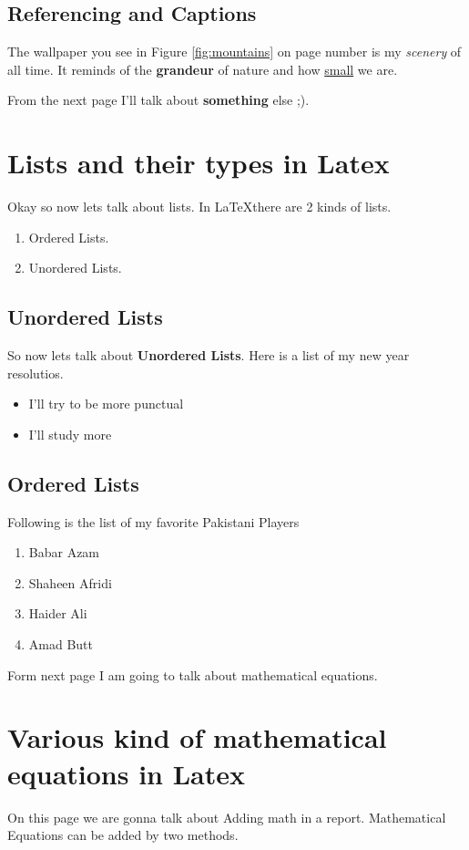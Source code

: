 \documentclass[10pt]{article}
\begin{document}
\subsection{Referencing and Captions}
The wallpaper you see in Figure \ref{fig:mountains} on page number \pageref{fig:mountains} is my \textit{scenery }of all time. It reminds of the \textbf{grandeur} of nature and how \underline{small} we are.

From the next page I'll talk about \textbf{something} else ;).
\newpage
\section{Lists and their types in Latex}
Okay so now lets talk about lists. In \LaTeX  there are 2 kinds of lists.

\begin{enumerate}
    \item Ordered Lists.
    \item Unordered Lists.
\end{enumerate}
\subsection{Unordered Lists}
So now lets talk about \textbf{Unordered Lists}. Here is a list of my new year resolutios.
\begin{itemize}
    \item I'll try to be more punctual
    \item {\large I'll study more}
\end{itemize}
\subsection{Ordered Lists}
Following is the list of my favorite Pakistani Players

\begin{enumerate}
    \item Babar Azam
    \item Shaheen Afridi
    \item Haider Ali
    \item Amad Butt
\end{enumerate}

Form next page I am going to talk about mathematical equations.

\newpage
\section{Various kind of mathematical equations in Latex}
On this page we are gonna talk about Adding math in a report. Mathematical Equations can be added by two methods.
\end{document}
